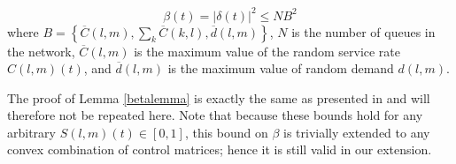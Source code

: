 \begin{Lem} \label{betalemma}
\begin{equation}\label{betabound}
\beta(t)  = \big| \delta(t) \big|^2 \leq NB^2 \end{equation}
where $B = \left\{ \overline{C}(l,m), \sum_{k} \overline{C}(k,l),  \overline{d}(l,m) \right\}$, 
$N$ is the number of queues in the network, $\overline{C} (l,m)$ is the maximum value of the random service rate $C(l,m)(t)$, and $ \overline{d}(l,m)$ is the maximum value of random demand $d(l,m)$.
\end{Lem}
The proof of Lemma \ref{betalemma} is exactly the same as presented in \cite{Varaiya2013} and will therefore not be repeated here. Note that because these bounds hold for any arbitrary $S(l,m)(t) \in [0,1]$, this bound on $\beta$ is trivially extended to any convex combination of control matrices; hence it is still valid in our extension.

